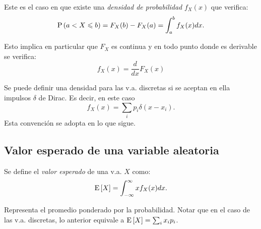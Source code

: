 \begin{ejemplo}
    Este es el caso en que existe una \emph{densidad de probabilidad} $f_X(x)$ que verifica:
    \begin{equation*}
    \mathrm{P}\left(a<X\leqslant b\right) = F_X(b)-F_X(a) = \int_a^b f_X(x) dx.
    \end{equation*}

    Esto implica en particular que $F_X$ es continua y en todo punto donde es derivable se verifica:
    \begin{equation*}
     f_X(x) = \frac{d}{dx}F_X(x)   
    \end{equation*}

    \begin{center}
    \hspace{1cm}
    \end{center}
    
\end{ejemplo}

\begin{remark}
Se puede definir una densidad para las v.a. discretas si se
aceptan en ella impulsos $\delta$ de Dirac. Es decir, en este caso \[
 f_X(x)=\sum_i p_i \delta(x-x_i).\]
 Esta convención se adopta en lo que sigue.
\end{remark}

\subsection*{Valor esperado de una variable aleatoria}

Se define el \emph{valor esperado} de una v.a. $X$ como:
\[
\mathrm{E}\left[X\right] =\int_{-\infty}^\infty x f_X(x) dx. \]

Representa el promedio ponderado por la probabilidad. Notar que en
el caso de las v.a. discretas, lo anterior equivale a
$\mathrm{E}\left[X\right]=\sum_i x_ip_i$.

